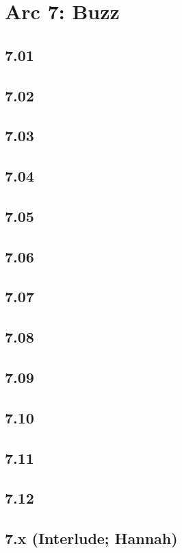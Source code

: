\part{Arc 7: Buzz}
 \chapter{7.01}
 \chapter{7.02}
 \chapter{7.03}
 \chapter{7.04}
 \chapter{7.05}
 \chapter{7.06}
 \chapter{7.07}
 \chapter{7.08}
 \chapter{7.09}
 \chapter{7.10}
 \chapter{7.11}
 \chapter{7.12}
 \chapter{7.x (Interlude; Hannah)}














